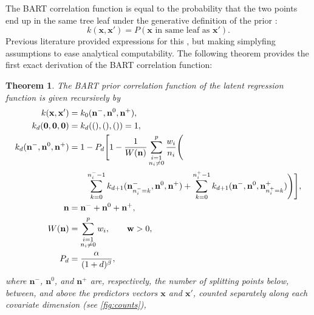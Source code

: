 \documentclass[a4paper]{article}
\newcommand{\nvecs}{\mathbf n^-, \mathbf n^0, \mathbf n^+}
\newtheorem{theorem}{Theorem}
\theoremstyle{definition}
\let\oldmarginpar\marginpar
\renewcommand{\marginpar}[1]{\oldmarginpar{\sffamily\scriptsize #1}}
\renewcommand{\marginpar}[1]{\relax} %
\begin{document}
    The BART correlation function is equal to the probability that the two points end up in the same tree leaf under the generative definition of the prior \autocite[\S5.2]{linero2017}:
    \begin{equation}
        k(\mathbf x, \mathbf x') = P(\text{$\mathbf x$ in same leaf as $\mathbf x'$}).
    \end{equation}
    Previous literature provided expressions for this \autocites[th.~4.1]{oreilly2022}[prop.~1]{linero2017}[prop.~1]{balog2016}, but making simplyfing assumptions to ease analytical computability. The following theorem provides the first exact derivation of the BART correlation function:
    \begin{theorem}
        \label{th:corr}
        The BART prior correlation function of the latent regression function is given recursively by
        \begin{align}
            k(\mathbf x, \mathbf x') &= k_0(\nvecs), \\
            k_d(\mathbf 0, \mathbf 0, \mathbf 0) &=
            k_d((),(),()) = 1, \\
            k_d(\nvecs) &= 1 - P_d \Bigg[1 - \frac1{W(\mathbf n)}
                \sum_{\substack{i=1 \\ n_i\ne 0}}^p \frac{w_i}{n_i} \Bigg( \notag \\
                    &\qquad \sum_{k=0}^{n^-_i - 1}
                    k_{d+1}(\mathbf n^-_{n^-_i=k}, \mathbf n^0, \mathbf n^+)
                    + \sum_{k=0}^{n^+_i - 1}
                    k_{d+1}(\mathbf n^-, \mathbf n^0, \mathbf n^+_{n^+_i=k})
                \Bigg)
            \Bigg], \label{eq:corr} \\
            \mathbf n &= \mathbf n^- + \mathbf n^0 + \mathbf n^+, \\
            W(\mathbf n) &= \sum_{\substack{i=1 \\ n_i\ne 0}}^p w_i, \qquad
            \mathbf w > 0, \\
            P_d &= \frac \alpha {(1+d)^\beta},
        \end{align}
        where $\mathbf n^-$, $\mathbf n^0$, and $\mathbf n^+$ are, respectively, the number of splitting points below, between, and above the predictors vectors $\mathbf x$ and $\mathbf x'$, counted separately along each covariate dimension (see \autoref{fig:counts}), \marginpar{It could be a poor choice to have the number of splitting points with the same name as the number of datapoints, although it is not ambiguous since the first appears as $\mathbf n$ or $n_i$ while the latter as $n$.}

\end{theorem}
\end{document}
